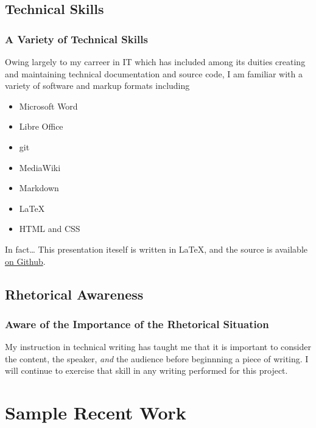 \documentclass{beamer}
\begin{document}
\subsection{Technical Skills}
\begin{frame}
  \frametitle{A Variety of Technical Skills}
  Owing largely to my carreer in IT which has included among its duities
  creating and maintaining technical documentation and source code, I am
  familiar with a variety of software and markup formats including
  \begin{itemize}
    \item Microsoft Word
    \item Libre Office
    \item git
    \item MediaWiki
    \item Markdown
    \item \LaTeX
    \item HTML and CSS
  \end{itemize}
  \begin{alertblock}{In fact\ldots}
    This presentation iteself is written in \LaTeX, and the source is available
    \href{http://github.com/werebus/ENGIN351-proposal}{on Github}.
  \end{alertblock}
\end{frame}

\subsection{Rhetorical Awareness}
\begin{frame}
  \frametitle{Aware of the Importance of the Rhetorical Situation}
  My instruction in technical writing has taught me that it is important to
  consider the content, the speaker, \emph{and} the audience before beginnning
  a piece of writing.  I will continue to exercise that skill in any writing
  performed for this project.
\end{frame}

\section{Sample Recent Work}
\end{document}
